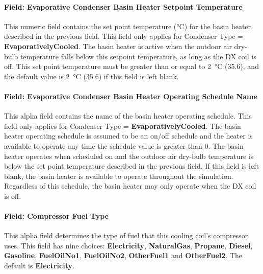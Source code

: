 \paragraph{Field: Evaporative Condenser Basin Heater Setpoint Temperature}\label{field-evaporative-condenser-basin-heater-setpoint-temperature-000}

This numeric field contains the set point temperature (\si{\celsius}) for the basin heater described in the previous field. This field only applies for Condenser Type = \textbf{EvaporativelyCooled}. The basin heater is active when the outdoor air dry-bulb temperature falls below this setpoint temperature, as long as the DX coil is off. This set point temperature must be greater than or equal to \SI{2}{\celsius} (\SI{35.6}{\fahrenheit}), and the default value is \SI{2}{\celsius} (\SI{35.6}{\fahrenheit}) if this field is left blank.

\paragraph{Field: Evaporative Condenser Basin Heater Operating Schedule Name}\label{field-evaporative-condenser-basin-heater-operating-schedule-name-000}

This alpha field contains the name of the basin heater operating schedule. This field only applies for Condenser Type = \textbf{EvaporativelyCooled}. The basin heater operating schedule is assumed to be an on/off schedule and the heater is available to operate any time the schedule value is greater than 0. The basin heater operates when scheduled on and the outdoor air dry-bulb temperature is below the set point temperature described in the previous field. If this field is left blank, the basin heater is available to operate throughout the simulation. Regardless of this schedule, the basin heater may only operate when the DX coil is off.

\paragraph{Field: Compressor Fuel Type}\label{field-compressor-fuel-type-000}

This alpha field determines the type of fuel that this cooling coil's compressor uses. This field has nine choices: \textbf{Electricity}, \textbf{NaturalGas}, \textbf{Propane}, \textbf{Diesel}, \textbf{Gasoline}, \textbf{FuelOilNo1}, \textbf{FuelOilNo2}, \textbf{OtherFuel1} and \textbf{OtherFuel2}. The default is \textbf{Electricity}.


